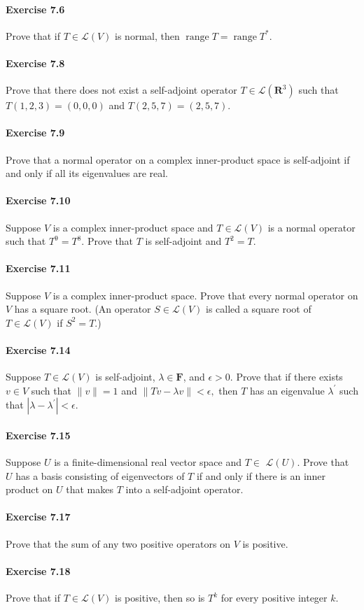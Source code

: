 \documentclass{article}
\begin{document}
\paragraph{Exercise 7.6} Prove that if $T \in \mathcal{L}(V)$ is normal, then $\operatorname{range} T=\operatorname{range} T^{*}.$

\paragraph{Exercise 7.8} Prove that there does not exist a self-adjoint operator $T \in \mathcal{L}\left(\mathbf{R}^{3}\right)$ such that $T(1,2,3)=(0,0,0)$ and $T(2,5,7)=(2,5,7)$.

\paragraph{Exercise 7.9} Prove that a normal operator on a complex inner-product space is self-adjoint if and only if all its eigenvalues are real.

\paragraph{Exercise 7.10} Suppose $V$ is a complex inner-product space and $T \in \mathcal{L}(V)$ is a normal operator such that $T^{9}=T^{8}$. Prove that $T$ is self-adjoint and $T^{2}=T$.

\paragraph{Exercise 7.11} Suppose $V$ is a complex inner-product space. Prove that every normal operator on $V$ has a square root. (An operator $S \in \mathcal{L}(V)$ is called a square root of $T \in \mathcal{L}(V)$ if $S^{2}=T$.)

\paragraph{Exercise 7.14} Suppose $T \in \mathcal{L}(V)$ is self-adjoint, $\lambda \in \mathbf{F}$, and $\epsilon>0$. Prove that if there exists $v \in V$ such that $\|v\|=1$ and $\|T v-\lambda v\|<\epsilon,$ then $T$ has an eigenvalue $\lambda^{\prime}$ such that $\left|\lambda-\lambda^{\prime}\right|<\epsilon$.

\paragraph{Exercise 7.15} Suppose $U$ is a finite-dimensional real vector space and $T \in$ $\mathcal{L}(U)$. Prove that $U$ has a basis consisting of eigenvectors of $T$ if and only if there is an inner product on $U$ that makes $T$ into a self-adjoint operator.

\paragraph{Exercise 7.17} Prove that the sum of any two positive operators on $V$ is positive.

\paragraph{Exercise 7.18} Prove that if $T \in \mathcal{L}(V)$ is positive, then so is $T^{k}$ for every positive integer $k$.
\end{document}
